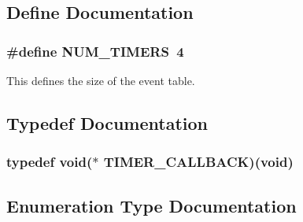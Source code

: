 \subsection{Define Documentation}
\subsubsection[{NUM\_\-TIMERS}]{\setlength{\rightskip}{0pt plus 5cm}\#define NUM\_\-TIMERS~4}\label{timer_8h_a34ad18456588200cc4dd40de41ba33f6}


This defines the size of the event table. 

\subsection{Typedef Documentation}
\subsubsection[{TIMER\_\-CALLBACK}]{\setlength{\rightskip}{0pt plus 5cm}typedef void($\ast$ {\bf TIMER\_\-CALLBACK})(void)}\label{timer_8h_afa050ddedd1442bab569c29062a646bc}


\subsection{Enumeration Type Documentation}

